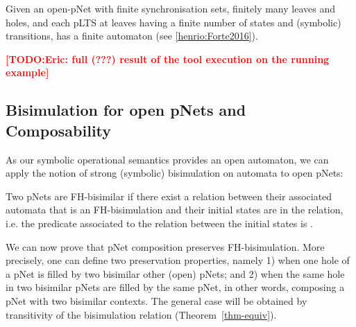 \documentclass{lncs/llncs}
\newcommand{\TODO}[1]{\textcolor{red}{\textbf{[TODO:#1]}}}
\begin{document}
Given an open-pNet
with finite synchronisation sets, finitely many leaves and
holes, and each pLTS at leaves having a finite number of states and
(symbolic) transitions, has a finite automaton (see \ref{henrio:Forte2016}).






\TODO{Eric: full (???) result of the tool execution on the running example}


\subsection{Bisimulation for open pNets and Composability}
\label{section:bisimulation-PN}
As  our symbolic operational semantics provides an open automaton, we can apply the notion of
	strong (symbolic) bisimulation on automata to open pNets:
\begin{definition}\label{def:bisim-pnets}
Two pNets are FH-bisimilar if there exist a relation between their associated 
automata that is an FH-bisimulation and their initial states are in the relation, i.e. 
the predicate associated to the relation between the initial states is \True.
\end{definition}
We can now prove that pNet composition  preserves
FH-bisimulation. More precisely, one can define two preservation
properties, namely 1) when one hole of a pNet is filled by two bisimilar other (open) pNets; and 2) when the same hole in two bisimilar pNets are
filled by the same pNet, in other words, composing a pNet with two
bisimilar contexts. The general case will be obtained by
transitivity of the bisimulation relation (Theorem~\ref{thm-equiv}). 
\end{document}
